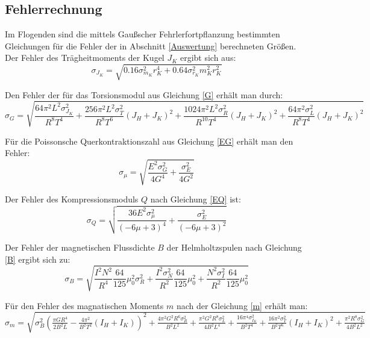     
  

    
   
      
      
     
      

  \subsection{Fehlerrechnung}
    \label{Fehlerrechnung}
    
    Im Flogenden sind die mittels Gaußscher Fehrlerfortpflanzung bestimmten Gleichungen für die Fehler
    der in Abschnitt \ref{Auswertung} berechneten Größen.\\
    
    Der Fehler des Trägheitmoments der Kugel $J_{K}$ ergibt sich aus: 
    \[ 
      \sigma_{J_{K}} =\sqrt{0.16 \sigma_{m_{K}}^{2} r_{K}^{4} + 0.64 \sigma_{r_{K}}^{2} m_{K}^{2} r_{K}^{2}}
    \]
    
    Den Fehler der für das Torsionsmodul aus Gleichung \ref{G} erhält man durch:
    \[
      \sigma_{G} = \sqrt{\frac{64 \pi^{2} L^{2} \sigma_{J_{K}}^{2}}{R^{8} T^{4}} + \frac{256 \pi^{2} L^{2} \sigma_{T}^{2}}{R^{8} T^{6}} \left(J_{H} + J_{K}\right)^{2} +
      \frac{1024 \pi^{2} L^{2} \sigma_{R}^{2}}{R^{10} T^{4}} \left(J_{H} + J_{K}\right)^{2} + \frac{64 \pi^{2} \sigma_{L}^{2}}{R^{8} T^{4}} \left(J_{H} + J_{K}\right)^{2}}
    \]
  
    Für die Poissonsche Querkontraktionszahl aus Gleichung \ref{EG} erhält man den Fehler:
    \[
      \sigma_{\mu} = \sqrt{\frac{E^{2} \sigma_{G}^{2}}{4 G^{4}} + \frac{\sigma_{E}^{2}}{4 G^{2}}}
    \]
  
    Der Fehler des Kompressionsmoduls $Q$ nach Gleichung \ref{EQ} ist:
    \[
      \sigma_{Q} = \sqrt{\frac{36 E^{2} \sigma_{\mu}^{2}}{\left(- 6 \mu + 3\right)^{4}} + \frac{\sigma_{E}^{2}}{\left(- 6 \mu + 3\right)^{2}}}
    \]
 
     Der Fehler der magnetischen Flussdichte $B$ der Helmholtzspulen nach Gleichung \ref{B} ergibt sich zu:
    \[
      \sigma_{B} = \sqrt{\frac{I^{2} N^{2}}{R^{4}} \frac{64}{125}\mu_{0}^{2} \sigma_{R}^{2} + \frac{I^{2} \sigma_{N}^{2}}{R^{2}}\frac{64}{125}\mu_{0}^{2}+ \frac{N^{2} \sigma_{I}^{2}}{R^{2}} \frac{64}{125}\mu_{0}^{2}}
    \]
  
    Für den Fehler des magnatischen Moments $m$ nach der Gleichung \ref{m} erhält man:\\
  
    $\sigma_{m} = \sqrt{\sigma_{B}^{2} \left(\frac{\pi G R^{4}}{2 B^{2} L} - \frac{ 4\pi^{2} }{B^{2} T^{2}} \left(I_{H} + I_{K}\right)\right)^{2} + \frac{4\pi^{2} G^{2} R^{6} \sigma_{R}^{2}}{B^{2} L^{2}} + 
     \frac{\pi^{2} G^{2} R^{8} \sigma_{L}^{2}}{4 B^{2} L^{4}} + \frac{16\pi^{4} \sigma_{I_{K}}^{2}}{B^{2} T^{4}} +
     \frac{16 \pi^{2} \sigma_{T}^{2}}{B^{2} T^{6}} \left(I_{H} + I_{K}\right)^{2} +  \frac{\pi^{2} R^{8} \sigma_{G}^{2}}{4 B^{2} L^{2}}}$
  
